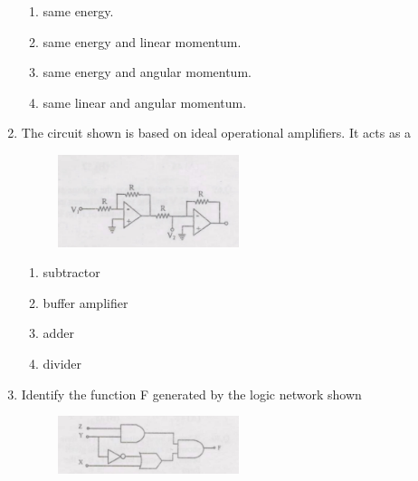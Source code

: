 \documentclass[journal,13pt,onecolumn]{IEEEtran}
\begin{document}
\begin{enumerate}[itemsep = 1em]
\begin{enumerate}
    \item same energy.
    \item same energy and linear momentum.
    \item same energy and angular momentum.
    \item same linear and angular momentum.
\end{enumerate}


\vspace{13em}

\item The circuit shown is based on ideal operational amplifiers. It acts as a 

\hfill{}

\begin{figure}[ht!]
    \centering
    \includegraphics[width=0.5\textwidth]{fig5.jpeg}
    \caption{}
    \label{fig:fig5.jpeg}
\end{figure}

\begin{multicols}{4}
\begin{enumerate}
    \item subtractor
    \item buffer amplifier
    \item adder
    \item divider
\end{enumerate} 
\end{multicols}

\item Identify the function F generated by the logic network shown

\hfill{}

\begin{figure}[ht!]
    \centering
    \includegraphics[width=0.5\textwidth]{fig6.jpeg}
    \caption{}
    \label{fig:fig6.jpeg}
\end{figure}


\end{enumerate}
\end{document}
